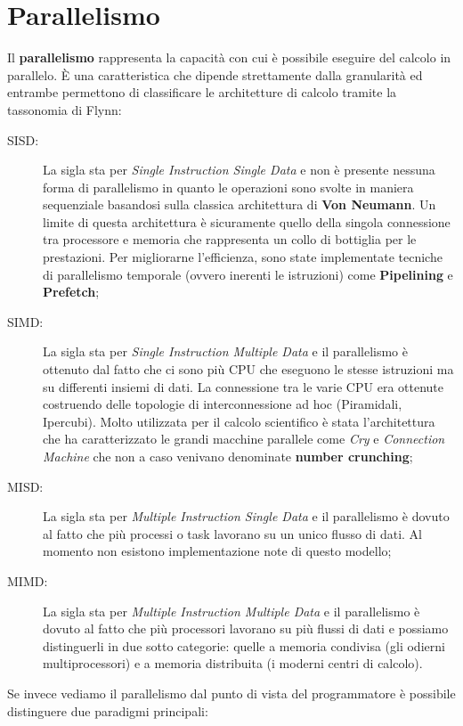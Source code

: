 \section{Parallelismo}
Il \textbf{parallelismo} rappresenta la capacità con cui è possibile eseguire del calcolo in parallelo. È una caratteristica che dipende strettamente dalla granularità ed entrambe permettono di classificare le architetture di calcolo tramite la tassonomia di Flynn:
\begin{description}
  \item[SISD:] La sigla sta per \textit{Single Instruction Single Data} e non è presente nessuna forma di parallelismo in quanto le operazioni sono svolte in maniera sequenziale basandosi sulla classica architettura di \textbf{Von Neumann}. Un limite di questa architettura è sicuramente quello della singola connessione tra processore e memoria che rappresenta un collo di bottiglia per le prestazioni. Per migliorarne l'efficienza, sono state implementate tecniche di parallelismo temporale (ovvero inerenti le istruzioni) come \textbf{Pipelining} e \textbf{Prefetch};
  \item[SIMD:] La sigla sta per \textit{Single Instruction Multiple Data} e il parallelismo è ottenuto dal fatto che ci sono più CPU che eseguono le stesse istruzioni ma su differenti insiemi di dati. La connessione tra le varie CPU era ottenute costruendo delle topologie di interconnessione ad hoc (Piramidali, Ipercubi). Molto utilizzata per il calcolo scientifico è stata l'architettura che ha caratterizzato le grandi macchine parallele come \textit{Cry} e \textit{Connection Machine} che non a caso venivano denominate \textbf{number crunching};
  \item[MISD:] La sigla sta per \textit{Multiple Instruction Single Data} e il parallelismo è dovuto al fatto che più processi o task lavorano su un unico flusso di dati. Al momento non esistono implementazione note di questo modello;
  \item[MIMD:] La sigla sta per \textit{Multiple Instruction Multiple Data} e il parallelismo è dovuto al fatto che più processori lavorano su più flussi di dati e possiamo distinguerli in due sotto categorie: quelle a memoria condivisa (gli odierni multiprocessori) e a memoria distribuita (i moderni centri di calcolo).
\end{description}
Se invece vediamo il parallelismo dal punto di vista del programmatore è possibile distinguere due paradigmi principali:
